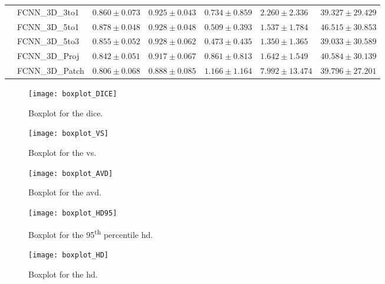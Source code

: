 \begin{sidewaystable}[htbp]
\begin{tabular}{l*{6}{l}}
                & FCNN\_3D\_3to1  & $0.860 \pm 0.073$ & $0.925 \pm 0.043$ & $0.734 \pm 0.859$ & $2.260  \pm 2.336 $ & $39.327 \pm 29.429$ \\
                & FCNN\_3D\_5to1  & $\mathbf{0.878 \pm 0.048}$ & $\mathbf{0.928 \pm 0.048}$ & $ 0.509 \pm 0.393	$ & $1.537  \pm 1.784 $ & $46.515 \pm 30.853$ \\
                & FCNN\_3D\_5to3  & $0.855 \pm 0.052$ & $0.928 \pm 0.062$ & $\mathbf{0.473 \pm 0.435}$ & $\mathbf{1.350  \pm 1.365} $ & $39.033 \pm 30.589$ \\                
                & FCNN\_3D\_Proj  & $0.842 \pm 0.051$ & $0.917 \pm 0.067$ & $0.861 \pm 0.813$ & $1.642  \pm 1.549 $ & $40.584 \pm 30.139$ \\
                & FCNN\_3D\_Patch & $0.806 \pm 0.068$ & $0.888 \pm 0.085$ & $1.166 \pm 1.164$ & $7.992  \pm 13.474$ & $39.796 \pm 27.201$ \\
      \bottomrule
   \end{tabular}
   \label{tab:results_3d_context}
\end{sidewaystable}

\begin{figure}[htbp]
	\centering
	\texttt{[image: boxplot\_DICE]}
    \caption[Boxplot for the \acrlong{dice}.]{Boxplot for the \acrlong{dice}.}
    \label{fig:results_boxplot_dice}
\end{figure}
\begin{figure}[htbp]
	\centering
	\texttt{[image: boxplot\_VS]}
    \caption[Boxplot for the \acrlong{vs}.]{Boxplot for the \acrlong{vs}.}
    \label{fig:results_boxplot_vs}
\end{figure}
\begin{figure}[htbp]
	\centering
	\texttt{[image: boxplot\_AVD]}
    \caption[Boxplot for the \acrlong{avd}.]{Boxplot for the \acrlong{avd}.}
    \label{fig:results_boxplot_avd}
\end{figure}
\begin{figure}[htbp]	
	\centering
	\texttt{[image: boxplot\_HD95]}
    \caption[Boxplot for the 95\textsuperscript{th} percentile \acrlong{hd}.]{Boxplot for the 95\textsuperscript{th} percentile \acrlong{hd}.}
    \label{fig:results_boxplot_hd95}
\end{figure}
\begin{figure}[htbp]	
	\centering
	\texttt{[image: boxplot\_HD]}
    \caption[Boxplot for the \acrlong{hd}.]{Boxplot for the \acrlong{hd}.}
    \label{fig:results_boxplot_hd}
\end{figure}

